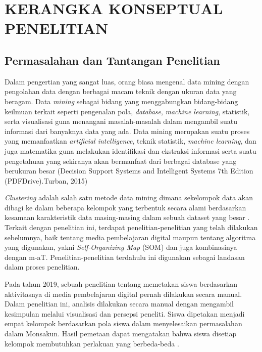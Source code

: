 \chapter{KERANGKA KONSEPTUAL PENELITIAN}

\section{Permasalahan dan Tantangan Penelitian}

Dalam pengertian yang sangat luas, orang biasa mengenal data mining dengan pengolahan data dengan berbagai macam teknik dengan ukuran data yang beragam. Data \textit{mining} sebagai bidang yang menggabungkan bidang‐bidang keilmuan terkait seperti pengenalan pola, \textit{database}, \textit{machine learning}, statistik, serta  visualisasi guna menangani masalah-masalah dalam mengambil suatu informasi dari banyaknya data yang ada. Data mining merupakan suatu proses yang memanfaatkan \textit{artificial intelligence}, teknik statistik, \textit{machine learning}, dan juga matematika guna melakukan identifikasi dan ekstraksi informasi serta suatu pengetahuan yang sekiranya akan bermanfaat dari berbagai database yang berukuran besar (Decision Support Systems and Intelligent Systems 7th Edition (PDFDrive).Turban, 2015)

\textit{Clustering} adalah salah satu metode data mining dimana sekelompok data akan dibagi ke dalam beberapa kelompok yang terbentuk secara alami berdasarkan  kesamaan karakteristik  data  masing-masing  dalam sebuah  dataset yang besar \citep{Singh2011}. Terkait dengan penelitian ini, terdapat penelitian‐penelitian     yang telah  dilakukan  sebelumnya, baik tentang media pembelajaran digital maupun tentang algoritma yang digunakan, yakni \textit{Self‐Organizing Map} (SOM) dan juga kombinasinya dengan m-aT. Penelitian-penelitian terdahulu ini digunakan sebagai landasan dalam proses penelitian.

Pada tahun 2019, sebuah penelitian tentang memetakan siswa berdasarkan aktivitasnya di media pembelajaran digital pernah dilakukan secara manual. Dalam penelitian ini, analisis dilakukan secara manual dengan mengambil kesimpulan melalui visualisasi dan persepsi peneliti. Siswa dipetakan menjadi empat kelompok berdasarkan pola siswa dalam menyelesaikan permasalahan dalam Monsakun. Hasil pemetaan dapat mengatakan bahwa siswa disetiap kelompok membutuhkan perlakuan yang berbeda-beda \citep{SupiantoHayashiHirashima2019}.

